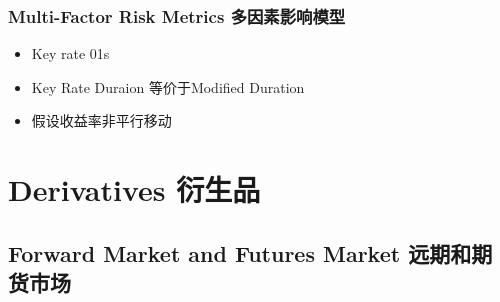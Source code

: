 \documentclass[a4paper,6pt,twoside,openany]{article}
\begin{document}
\subsubsection{Multi-Factor Risk Metrics 多因素影响模型}
\begin{itemize}
\item Key rate 01s
\item Key Rate Duraion 等价于Modified Duration
\item 假设收益率非平行移动

\end{itemize}

\newpage

\section{Derivatives 衍生品}
\subsection{Forward Market and Futures Market 远期和期货市场}
\end{document}
